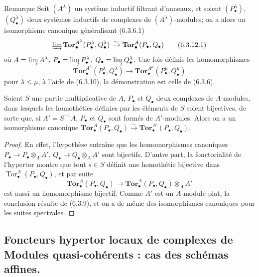 \begin{namedtheorem}[6.3.12]{Remarque}
Soit $(A^\lambda)$ un système inductif filtrant d'anneaux, et soient
$(P_\bullet^\lambda)$, $(Q_\bullet^\lambda)$ deux systèmes inductifs de
complexes de $(A^\lambda)$-modules; on a alors un isomorphisme canonique
généralisant (6.3.6.1)
\[
  \varinjlim
  \mathbf{Tor}_\bullet^{A^\lambda}
  (P_\bullet^\lambda,Q_\bullet^\lambda)
  \xrightarrow{\sim}
  \mathbf{Tor}_\bullet^A(P_\bullet,Q_\bullet)
  \tag{6.3.12.1}\label{III.6.3.12.1.fr}
\]
où $A=\varinjlim A^\lambda$, $P_\bullet=\varinjlim P_\bullet^\lambda$,
$Q_\bullet=\varinjlim Q_\bullet^\lambda$. Une fois définis les
homomorphismes
\[
  \mathbf{Tor}_\bullet^{A^\lambda}
  (P_\bullet^\lambda,Q_\bullet^\lambda)
  \longrightarrow
  \mathbf{Tor}_\bullet^{A^\mu}
  (P_\bullet^\mu,Q_\bullet^\mu)
\]
pour $\lambda\leqslant\mu$, à l'aide de (6.3.10), la démonstration est celle
de (6.3.6).
\end{namedtheorem}

\begin{proposition}[6.3.13]
Soient $S$ une partie multiplicative de $A$, $P_\bullet$ et $Q_\bullet$ deux
complexes de $A$-modules, dans lesquels les homothéties définies par les
éléments de $S$ soient bijectives, de sorte que, si $A'=S^{-1}A$,
$P_\bullet$ et $Q_\bullet$ sont formés de $A'$-modules. Alors on a un
isomorphisme canonique
$\mathbf{Tor}_\bullet^A(P_\bullet,Q_\bullet)
\xrightarrow{\sim}
\mathbf{Tor}_\bullet^{A'}(P_\bullet,Q_\bullet)$.
\end{proposition}

\begin{proof}
En effet, l'hypothèse entraîne que les homomorphismes canoniques
$P_\bullet\to P_\bullet\otimes_A A'$,
$Q_\bullet\to Q_\bullet\otimes_A A'$ sont bijectifs. D'autre part, la
fonctorialité de l'hypertor montre que tout $s\in S$ définit une homothétie
bijective dans $\operatorname{Tor}_\bullet^A(P_\bullet,Q_\bullet)$, et par suite
\[
  \mathbf{Tor}_\bullet^A(P_\bullet,Q_\bullet)
  \longrightarrow
  \mathbf{Tor}_\bullet^A(P_\bullet,Q_\bullet)\otimes_A A'
\]
est aussi un homomorphisme bijectif. Comme $A'$ est un $A$-module plat, la
conclusion résulte de (6.3.9), et on a de même des isomorphismes canoniques
pour les suites spectrales.
\end{proof}

\subsection{Foncteurs hypertor locaux de complexes de Modules quasi-cohérents : cas des schémas affines.}


